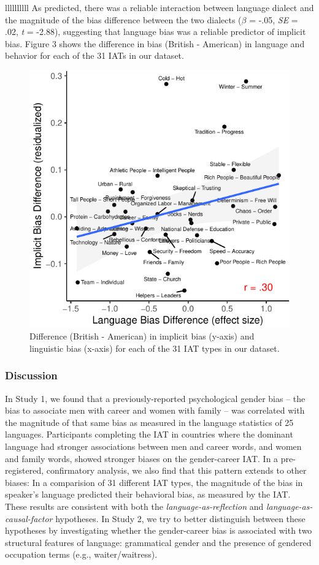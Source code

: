\documentclass[9pt,twocolumn,twoside,lineno]{pnas-new}
\begin{document}
\begin{table}{llllllllll}
As predicted, there was a reliable interaction between language dialect
and the magnitude of the bias difference between the two dialects
(\(\beta\) = -.05, \emph{SE} = .02, \emph{t} = -2.88), suggesting that
language bias was a reliable predictor of implicit bias. Figure 3 shows
the difference in bias (British - American) in language and behavior for
each of the 31 IATs in our dataset.

\begin{figure}
\centering
\includegraphics[width=.8\linewidth]{iat_lang_files/figure-latex/1cplot-1.pdf}
\caption{\label{fig:1cplot}Difference (British - American) in implicit bias
(y-axis) and linguistic bias (x-axis) for each of the 31 IAT types in
our dataset.}
\end{figure}

\subsubsection*{Discussion}\label{discussion}

In Study 1, we found that a previously-reported psychological gender
bias -- the bias to associate men with career and women with family --
was correlated with the magnitude of that same bias as measured in the
language statistics of 25 languages. Participants completing the IAT in
countries where the dominant language had stronger associations between
men and career words, and women and family words, showed stronger biases
on the gender-career IAT. In a pre-registered, confirmatory analysis, we
also find that this pattern extends to other biases: In a comparision of
31 different IAT types, the magnitude of the bias in speaker's language
predicted their behavioral bias, as measured by the IAT. These results
are consistent with both the \emph{language-as-reflection} and
\emph{language-as-causal-factor} hypotheses. In Study 2, we try to
better distinguish between these hypotheses by investigating whether the
gender-career bias is associated with two structural features of
language: grammatical gender and the presence of gendered occupation
terms (e.g., waiter/waitress).


\end{table}
\end{document}
